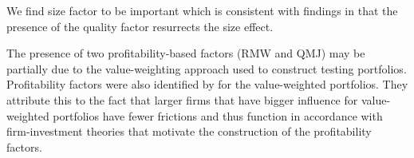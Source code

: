We find size factor to be important which is consistent with findings in \cite{asness2014quality} that the presence of the quality factor resurrects the size effect. 

The presence of two profitability-based factors (RMW and QMJ) may be partially due to the value-weighting approach used to construct testing portfolios. 
Profitability factors were also identified by \cite{harvey2015lucky} for the value-weighted portfolios.
They attribute this to the fact that larger firms that have bigger influence for value-weighted portfolios have fewer frictions and thus function in accordance with firm-investment theories that motivate the construction of the profitability factors.

